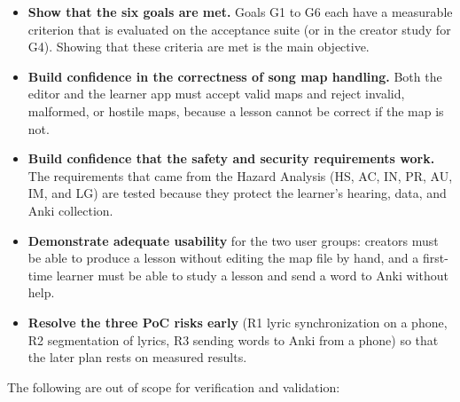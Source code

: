 \documentclass[12pt, titlepage]{article}
\begin{document}
\begin{itemize}
  \item \textbf{Show that the six goals are met.} Goals G1 to G6 each have a
        measurable criterion that is evaluated on the acceptance suite (or in
        the creator study for G4). Showing that these criteria are met is the
        main objective.
  \item \textbf{Build confidence in the correctness of song map handling.}
        Both the editor and the learner app must accept valid maps and reject
        invalid, malformed, or hostile maps, because a lesson cannot be
        correct if the map is not.
  \item \textbf{Build confidence that the safety and security requirements
        work.} The requirements that came from the Hazard Analysis (HS, AC,
        IN, PR, AU, IM, and LG) are tested because they protect the learner's
        hearing, data, and Anki collection.
  \item \textbf{Demonstrate adequate usability} for the two user groups:
        creators must be able to produce a lesson without editing the map
        file by hand, and a first-time learner must be able to study a lesson
        and send a word to Anki without help.
  \item \textbf{Resolve the three PoC risks early} (R1 lyric synchronization on
        a phone, R2 segmentation of lyrics, R3 sending words to Anki from a
        phone) so that the later plan rests on measured results.
\end{itemize}

The following are out of scope for verification and validation:
\end{document}

